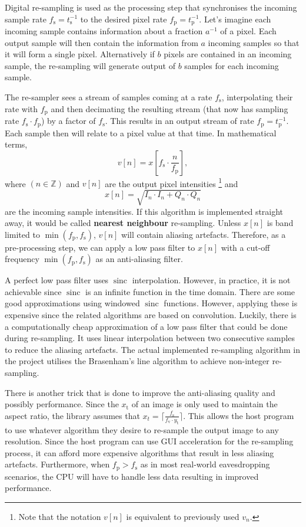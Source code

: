 \documentclass[a4paper,12pt,twoside,openright]{report}
\begin{document}
Digital re-sampling is used as the processing step that synchronises the incoming sample rate $f_\text{s} = t_\text{s}^{-1}$ to the desired pixel rate $f_\text{p} = t_\text{p}^{-1}$. Let's imagine each incoming sample contains information about a fraction $a^{-1}$ of a pixel. Each output sample will then contain the information from $a$ incoming samples so that it will form a single pixel. Alternatively if $b$ pixels are contained in an incoming sample, the re-sampling will generate output of $b$ samples for each incoming sample.

The re-sampler sees a stream of samples coming at a rate $f_\text{s}$, interpolating their rate with $f_\text{p}$ and then decimating the resulting stream (that now has sampling rate $f_\text{s} \cdot f_\text{p} $) by a factor of $f_\text{s}$. This results in an output stream of rate $f_\text{p} = t_\text{p}^{-1}$. Each sample then will relate to a pixel value at that time. In mathematical terms,
$$ v[n] = x\left[f_\text{s} \cdot \frac{n}{f_\text{p}} \right],$$
where $(n \in \mathbb{Z})$ and  $v[n]$ are the output pixel intensities \footnote{Note that the notation $v[n]$ is equivalent to previously used $v_{n}$.} and 
$$x[n] = \sqrt{I_{n} \cdot I_{n} + Q_{n} \cdot Q_{n}}$$
are the incoming sample intensities. If this algorithm is implemented straight away, it would be called \textbf{nearest neighbour} re-sampling. Unless $x[n]$ is band limited to $\min (f_\text{p}, f_\text{s})$, $v[n]$ will contain aliasing artefacts. Therefore, as a pre-processing step, we can apply a low pass filter to $x[n]$ with a cut-off frequency $\min (f_\text{p}, f_\text{s})$ as an anti-aliasing filter.

A perfect low pass filter uses $\operatorname{sinc}$ interpolation. However, in practice, it is not achievable since $\operatorname{sinc}$ is an infinite function in the time domain. There are some good approximations using windowed $\operatorname{sinc}$ functions. However, applying these is expensive since the related algorithms are based on convolution. Luckily, there is a computationally cheap approximation of a low pass filter that could be done during re-sampling. It uses linear interpolation between two consecutive samples to reduce the aliasing artefacts. The actual implemented re-sampling algorithm in the project utilises the Brasenham's line algorithm\cite{bresenham1965algorithm} to achieve non-integer re-sampling.

There is another trick that is done to improve the anti-aliasing quality and possibly performance. Since the $x_\text{t}$ of an image is only used to maintain the aspect ratio, the library assumes that $x_{t} = \lceil \frac{f_\text{s}}{f_\text{v} \cdot y_\text{t}} \rceil$. This allows the host program to use whatever algorithm they desire to re-sample the output image to any resolution. Since the host program can use GUI acceleration for the re-sampling process, it can afford more expensive algorithms that result in less aliasing artefacts. Furthermore, when $f_\text{p} > f_\text{s}$ as in most real-world eavesdropping scenarios, the CPU will have to handle less data resulting in improved performance.
\end{document}
